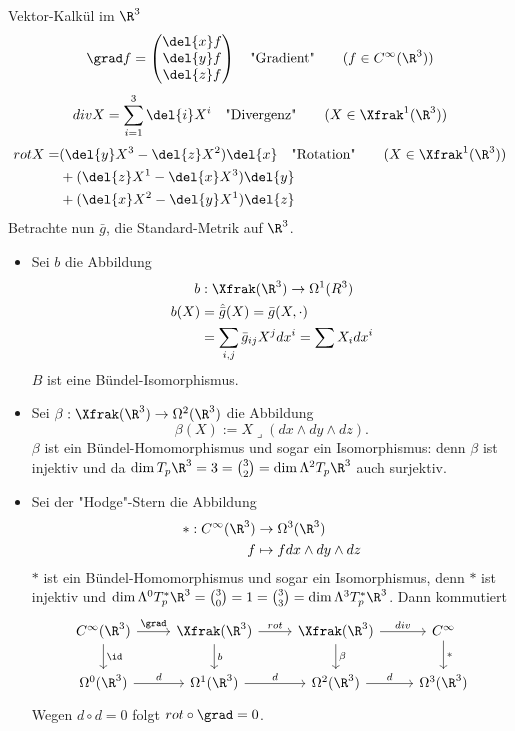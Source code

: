 \begin{rem}
	Vektor-Kalkül im $\R^3$\\
	\[ \grad f = \begin{pmatrix}
		\del{x}f \\ \del{y}f \\ \del{z}f
		\end{pmatrix} \quad \text{"Gradient"} \qquad (f \in C^\infty(\R^3)) \]
	\[ div X = \sum_{i=1}^3 \del{i} X^i \quad \text{"Divergenz"} \qquad (X \in \Xfrak^1(\R^3)) \]
	\begin{align*}
		rot X =& (\del{y}X^3 - \del{z}X^2) \del{x} \quad \text{"Rotation"} \qquad (X \in \Xfrak^1(\R^3))\\
		&+ (\del{z}X^1 - \del{x}X^3) \del{y}\\
		&+ (\del{x}X^2 - \del{y}X^1) \del{z}
	\end{align*}
	Betrachte nun $\bar{g}$, die Standard-Metrik auf $\R^3$.
	\begin{itemize}
		\item Sei $b$ die Abbildung
			\begin{align*}
				b&: \Xfrak(\R^3) \to \Omega^1(R^3)\\
				b(X) &= \hat{\bar{g}}(X) = \bar{g}(X,\cdot)\\
				&= \sum_{i,j} \bar{g}_{ij} X^j dx^i = \sum X_i dx^i
			\end{align*}
			$B$ ist eine Bündel-Isomorphismus.
		
		\item Sei $ \beta: \Xfrak(\R^3) \to \Omega^2(\R^3) $ die Abbildung
			\[ \beta(X):= X \lrcorner (dx \wedge dy \wedge dz). \]
			$\beta$ ist ein Bündel-Homomorphismus und sogar ein Isomorphismus: denn $\beta$ ist injektiv und da $\dim T_p\R^3 = 3 = \binom{3}{2} = \dim \Lambda^2 T_p\R^3$ auch surjektiv.
		
		\item Sei der "Hodge"-Stern die Abbildung
			\begin{align*}
				*: C^\infty(\R^3) &\to \Omega^3(\R^3)\\
				f &\mapsto f dx \wedge dy \wedge dz
			\end{align*}
			$*$ ist ein Bündel-Homomorphismus und sogar ein Isomorphismus, denn $*$ ist injektiv und $\dim \Lambda^0 T_p^*\R^3 = \binom{3}{0} = 1 = \binom{3}{3} = \dim \Lambda^3 T_p^*\R^3$. Dann kommutiert
			\[ \begin{tikzcd}
				C^\infty(\R^3) \arrow{r}{\grad} \arrow{d}{\id} & \Xfrak(\R^3) \arrow{r}{rot} \arrow{d}{b} & \Xfrak(\R^3) \arrow{r}{div} \arrow{d}{\beta} & C^\infty \arrow{d}{*}\\
				\Omega^0(\R^3) \arrow{r}{d} & \Omega^1(\R^3) \arrow{r}{d} & \Omega^2(\R^3) \arrow{r}{d} & \Omega^3(\R^3)
			\end{tikzcd} \]
			Wegen $ d \circ d = 0 $ folgt $rot \circ \grad = 0$.
	\end{itemize}
\end{rem}